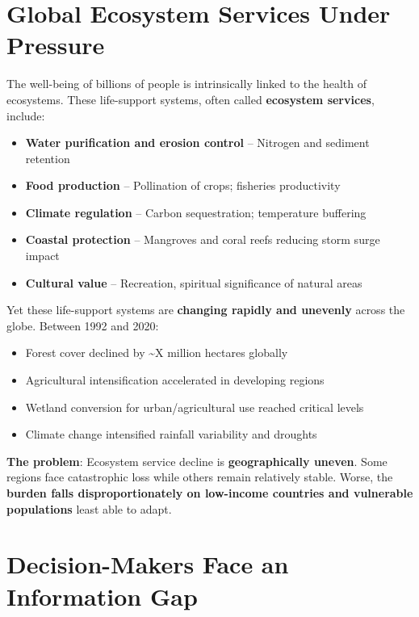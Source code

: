 \documentclass[
  letterpaper,
  DIV=11,
  numbers=noendperiod]{scrreprt}
\providecommand{\tightlist}{%
  \setlength{\itemsep}{0pt}\setlength{\parskip}{0pt}}
\begin{document}
\hfill\break

\section{Global Ecosystem Services Under
Pressure}\label{global-ecosystem-services-under-pressure}

The well-being of billions of people is intrinsically linked to the
health of ecosystems. These life-support systems, often called
\textbf{ecosystem services}, include:

\begin{itemize}
\tightlist
\item
  \textbf{Water purification and erosion control} -- Nitrogen and
  sediment retention
\item
  \textbf{Food production} -- Pollination of crops; fisheries
  productivity
\item
  \textbf{Climate regulation} -- Carbon sequestration; temperature
  buffering
\item
  \textbf{Coastal protection} -- Mangroves and coral reefs reducing
  storm surge impact
\item
  \textbf{Cultural value} -- Recreation, spiritual significance of
  natural areas
\end{itemize}

Yet these life-support systems are \textbf{changing rapidly and
unevenly} across the globe. Between 1992 and 2020:

\begin{itemize}
\tightlist
\item
  Forest cover declined by \textasciitilde X million hectares globally
\item
  Agricultural intensification accelerated in developing regions
\item
  Wetland conversion for urban/agricultural use reached critical levels
\item
  Climate change intensified rainfall variability and droughts
\end{itemize}

\textbf{The problem}: Ecosystem service decline is
\textbf{geographically uneven}. Some regions face catastrophic loss
while others remain relatively stable. Worse, the \textbf{burden falls
disproportionately on low-income countries and vulnerable populations}
least able to adapt.

\section{Decision-Makers Face an Information
Gap}\label{decision-makers-face-an-information-gap}
\end{document}
